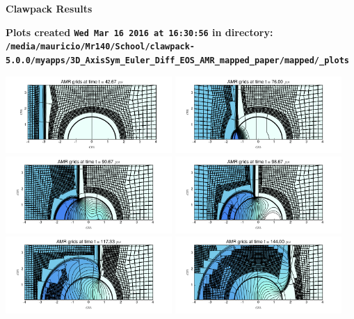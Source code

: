 \documentclass[11pt]{article}
\begin{document}
        \begin{center}{\Large\bf Clawpack Results}\vskip 5pt
        
        \bf Plots created {\tt Wed Mar 16 2016 at 16:30:56} in directory: \vskip 5pt
        \verb+/media/mauricio/Mr140/School/clawpack-5.0.0/myapps/3D_AxisSym_Euler_Diff_EOS_AMR_mapped_paper/mapped/_plots+
        \end{center}
        \vskip 5pt
        \includegraphics[width=0.475\textwidth]{frame0032fig4.png}
\vskip 10pt 
\includegraphics[width=0.475\textwidth]{frame0057fig4.png}
\vskip 10pt 
\includegraphics[width=0.475\textwidth]{frame0068fig4.png}
\vskip 10pt 
\includegraphics[width=0.475\textwidth]{frame0074fig4.png}
\vskip 10pt 
\includegraphics[width=0.475\textwidth]{frame0088fig4.png}
\vskip 10pt 
\includegraphics[width=0.475\textwidth]{frame0108fig4.png}
\end{document}
